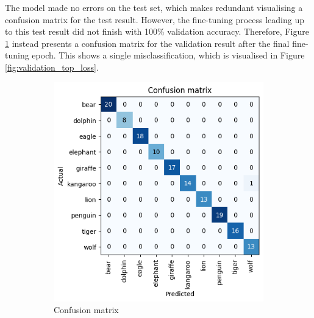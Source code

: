 The model made no errors on the test set, which makes redundant visualising a confusion matrix for the test result. However, the fine-tuning process leading up to this test result did not finish with 100\% validation accuracy. Therefore, Figure \ref{fig:validation_confusion} instead presents a confusion matrix for the validation result after the final fine-tuning epoch. This shows a single misclassification, which is visualised in Figure \ref{fig:validation_top_loss}.

\begin{figure}[ht]
  \centering
  \begin{subfigure}[t]{0.45\textwidth}
    \vskip 0pt %
    \centering
    \includegraphics[width=\textwidth]{images/q2_validation_confusion.png}
    \caption{Confusion matrix}
    \label{fig:validation_confusion}
  \end{subfigure}
  \hfill
  \begin{subfigure}[t]{0.45\textwidth}
    \vskip 0pt %
    \centering

\end{subfigure}
\end{figure}
